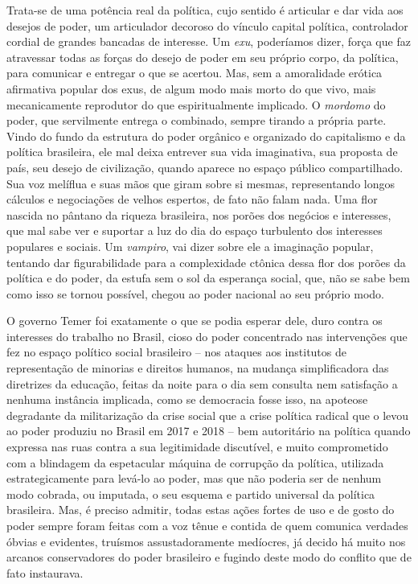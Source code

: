 Trata-se de uma potência real da política, cujo sentido é articular e
dar vida aos desejos de poder, um articulador decoroso do vínculo
capital política, controlador cordial de grandes bancadas de interesse.
Um \emph{exu}, poderíamos dizer, força que faz atravessar todas as
forças do desejo de poder em seu próprio corpo, da política, para
comunicar e entregar o que se acertou. Mas, sem a amoralidade erótica
afirmativa popular dos exus, de algum modo mais morto do que vivo, mais
mecanicamente reprodutor do que espiritualmente implicado. O
\emph{mordomo} do poder, que servilmente entrega o combinado, sempre
tirando a própria parte. Vindo do fundo da estrutura do poder orgânico e
organizado do capitalismo e da política brasileira, ele mal deixa
entrever sua vida imaginativa, sua proposta de país, seu desejo de
civilização, quando aparece no espaço público compartilhado. Sua voz
melíflua e suas mãos que giram sobre si mesmas, representando longos
cálculos e negociações de velhos espertos, de fato não falam nada. Uma
flor nascida no pântano da riqueza brasileira, nos porões dos negócios e
interesses, que mal sabe ver e suportar a luz do dia do espaço
turbulento dos interesses populares e sociais. Um \emph{vampiro}, vai
dizer sobre ele a imaginação popular, tentando dar figurabilidade para a
complexidade ctônica dessa flor dos porões da política e do poder, da
estufa sem o sol da esperança social, que, não se sabe bem como isso se
tornou possível, chegou ao poder nacional ao seu próprio modo.

O governo Temer foi exatamente o que se podia esperar dele, duro contra
os interesses do trabalho no Brasil, cioso do poder concentrado nas
intervenções que fez no espaço político social brasileiro -- nos ataques
aos institutos de representação de minorias e direitos humanos, na
mudança simplificadora das diretrizes da educação, feitas da noite para
o dia sem consulta nem satisfação a nenhuma instância implicada, como se
democracia fosse isso, na apoteose degradante da militarização da crise
social que a crise política radical que o levou ao poder produziu no
Brasil em 2017 e 2018 -- bem autoritário na política quando expressa nas
ruas contra a sua legitimidade discutível, e muito comprometido com a
blindagem da espetacular máquina de corrupção da política, utilizada
estrategicamente para levá-lo ao poder, mas que não poderia ser de
nenhum modo cobrada, ou imputada, o seu esquema e partido universal da
política brasileira. Mas, é preciso admitir, todas estas ações fortes de
uso e de gosto do poder sempre foram feitas com a voz tênue e contida de
quem comunica verdades óbvias e evidentes, truísmos assustadoramente
medíocres, já decido há muito nos arcanos conservadores do poder
brasileiro e fugindo deste modo do conflito que de fato instaurava.

